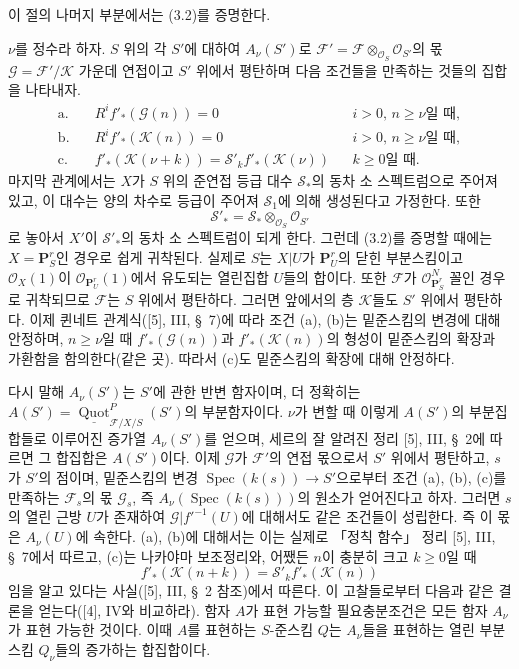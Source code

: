 이 절의 나머지 부분에서는 (3.2)를 증명한다.

$\nu$를 정수라 하자. $S$ 위의 각 $S'$에 대하여 $A_\nu(S')$로
$\mathcal F'=\mathcal F\otimes_{\mathcal O_S}\mathcal O_{S'}$의
몫 $\mathcal G=\mathcal F'/\mathcal K$ 가운데 연접이고 $S'$ 위에서
평탄하며 다음 조건들을 만족하는 것들의 집합을 나타내자.
\begin{align*}
\text{a.}\quad &R^if'_*(\mathcal G(n))=0 &&\text{$i>0$, $n\geq\nu$일 때},\\
\text{b.}\quad &R^if'_*(\mathcal K(n))=0 &&\text{$i>0$, $n\geq\nu$일 때},\\
\text{c.}\quad &f'_*(\mathcal K(\nu+k))
=\mathcal S'_k f'_*(\mathcal K(\nu)) &&\text{$k\geq0$일 때}.
\end{align*}
마지막 관계에서는 $X$가 $S$ 위의 준연접 등급 대수 $\mathcal S_*$의
동차 소 스펙트럼으로 주어져 있고, 이 대수는 양의 차수로 등급이 주어져
$\mathcal S_1$에 의해 생성된다고 가정한다. 또한
\[
\mathcal S'_* =\mathcal S_*\otimes_{\mathcal O_S}\mathcal O_{S'}
\]
로 놓아서 $X'$이 $\mathcal S'_*$의 동차 소 스펙트럼이 되게 한다.
그런데 (3.2)를 증명할 때에는 $X=\mathbf P^r_S$인 경우로 쉽게
귀착된다. 실제로 $S$는 $X|U$가 $\mathbf P^r_U$의 닫힌 부분스킴이고
$\mathcal O_X(1)$이 $\mathcal O_{\mathbf P^r_U}(1)$에서 유도되는
열린집합 $U$들의 합이다. 또한 $\mathcal F$가
$\mathcal O_{\mathbf P^r_S}^{N}$ 꼴인 경우로 귀착되므로 $\mathcal F$는
$S$ 위에서 평탄하다. 그러면 앞에서의 층 $\mathcal K$들도 $S'$ 위에서
평탄하다. 이제 퀸네트 관계식([5], III, \S~7)에 따라 조건 (a), (b)는
밑준스킴의 변경에 대해 안정하며, $n\geq\nu$일 때
$f'_*(\mathcal G(n))$과 $f'_*(\mathcal K(n))$의 형성이 밑준스킴의
확장과 가환함을 함의한다(같은 곳). 따라서 (c)도 밑준스킴의 확장에
대해 안정하다.

다시 말해 $A_\nu(S')$는 $S'$에 관한 반변 함자이며, 더 정확히는
$A(S')=\underline{\operatorname{Quot}}^P_{\mathcal F/X/S}(S')$의
부분함자이다. $\nu$가 변할 때 이렇게 $A(S')$의 부분집합들로 이루어진
증가열 $A_\nu(S')$를 얻으며, 세르의 잘 알려진 정리 [5], III, \S~2에
따르면 그 합집합은 $A(S')$이다. 이제 $\mathcal G$가 $\mathcal F'$의
연접 몫으로서 $S'$ 위에서 평탄하고, $s$가 $S'$의 점이며, 밑준스킴의
변경 $\operatorname{Spec}(k(s))\longrightarrow S'$으로부터 조건 (a),
(b), (c)를 만족하는 $\mathcal F_s$의 몫 $\mathcal G_s$, 즉
$A_\nu(\operatorname{Spec}(k(s)))$의 원소가 얻어진다고 하자. 그러면
$s$의 열린 근방 $U$가 존재하여 $\mathcal G|f'^{-1}(U)$에 대해서도
같은 조건들이 성립한다. 즉 이 몫은 $A_\nu(U)$에 속한다. (a), (b)에
대해서는 이는 실제로 「정칙 함수」 정리 [5], III, \S~7에서 따르고,
(c)는 나카야마 보조정리와, 어쨌든 $n$이 충분히 크고 $k\geq0$일 때
\[
f'_*(\mathcal K(n+k))=\mathcal S'_k f'_*(\mathcal K(n))
\]
임을 알고 있다는 사실([5], III, \S~2 참조)에서 따른다. 이 고찰들로부터
다음과 같은 결론을 얻는다([4], IV와 비교하라). 함자 $A$가 표현 가능할
필요충분조건은 모든 함자 $A_\nu$가 표현 가능한 것이다. 이때 $A$를
표현하는 $S$-준스킴 $Q$는 $A_\nu$들을 표현하는 열린 부분스킴
$Q_\nu$들의 증가하는 합집합이다.

